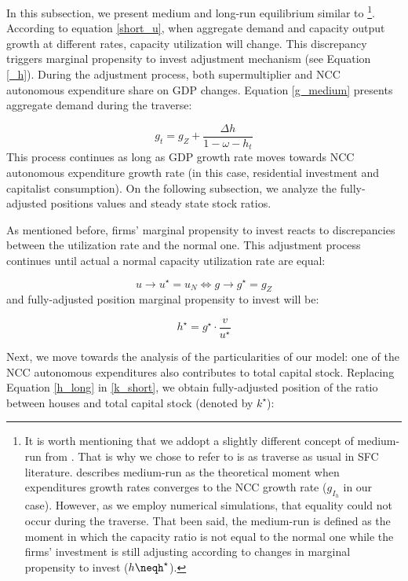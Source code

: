 \documentclass[11pt]{article}
\begin{document}
In this subsection, we present medium and long-run equilibrium similar to  \textcite{freitas_growth_2015}\footnote{It is worth mentioning that we addopt a slightly different concept of medium-run from \textcite{freitas_growth_2015}. That is why we chose to refer to is as traverse as usual in SFC literature. \textcite{freitas_growth_2015} describes medium-run as the theoretical moment when expenditures growth rates converges to the NCC growth rate (\(g_{I_h}\) in our case). However, as we employ numerical simulations, that equality could not occur during the traverse. That been said, the medium-run is defined as the moment in which the capacity ratio is not equal to the normal one while the firms' investment is still adjusting according to changes in marginal propensity to invest (\(h\neqh^\star\)).}.
According to equation \ref{short_u}, when aggregate demand and capacity output growth at different rates, capacity utilization will change. 
This discrepancy triggers marginal propensity to invest adjustment mechanism (see Equation \ref{_h}). 
During the adjustment process, both supermultiplier and NCC autonomous expenditure share on GDP changes.
Equation \ref{g_medium} presents aggregate demand during the traverse:

\begin{equation}
\label{g_medium}
g_t = g_{Z} + \frac{\Delta h}{1 - \omega - h_{t}}
\end{equation}
This process continues as long as GDP growth rate moves towards NCC autonomous expenditure growth rate (in this case, residential investment and capitalist consumption). On the following subsection, we analyze the fully-adjusted positions values and steady state stock ratios.

As mentioned before, firms’ marginal propensity to invest reacts to discrepancies between the utilization rate and the normal one.  This adjustment process continues until actual a normal capacity utilization rate are equal:

$$
u \to u^{\star}  = u_N \Leftrightarrow g \to g^{\star} = g_Z
$$
and fully-adjusted position marginal propensity to invest will be:


\begin{equation}
\label{h_long}
h^{\star} = g^{\star}\cdot \frac{v}{u^{\star}}
\end{equation}

Next, we move towards the analysis of the particularities of our model:  one of the NCC autonomous expenditures also contributes to total capital stock.  
Replacing Equation \ref{h_long} in \ref{k_short}, we obtain fully-adjusted position of the ratio between houses and total capital stock (denoted by \(k^\star\)):
\end{document}
